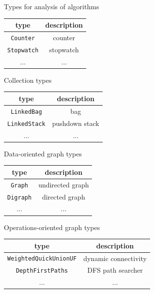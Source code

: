 \documentclass[8pt,a4paper,compress]{beamer}
\begin{document}
\begin{frame}[fragile]
\pause

Types for analysis of algorithms
\begin{center}
\begin{tabular}{cc}
type & description \\ \hline
\lstinline$Counter$ &  counter \\
\lstinline$Stopwatch$ & stopwatch \\
$\dots$ & $\dots$
\end{tabular} 
\end{center}

\pause

Collection types
\begin{center}
\begin{tabular}{cc}
type & description \\ \hline
\lstinline$LinkedBag$ & bag \\
\lstinline$LinkedStack$ & pushdown stack \\
$\dots$ & $\dots$
\end{tabular} 
\end{center}

\pause

Data-oriented graph types
\begin{center}
\begin{tabular}{cc}
type & description \\ \hline
\lstinline$Graph$  & undirected graph \\
\lstinline$Digraph$ & directed graph \\
$\dots$ & $\dots$
\end{tabular} 
\end{center}

\pause

Operations-oriented graph types
\begin{center}
\begin{tabular}{cc}
type & description \\ \hline
\lstinline$WeightedQuickUnionUF$ & dynamic connectivity \\
\lstinline$DepthFirstPaths$ & DFS path searcher \\
$\dots$ & $\dots$
\end{tabular} 
\end{center}
\end{frame}
\end{document}

